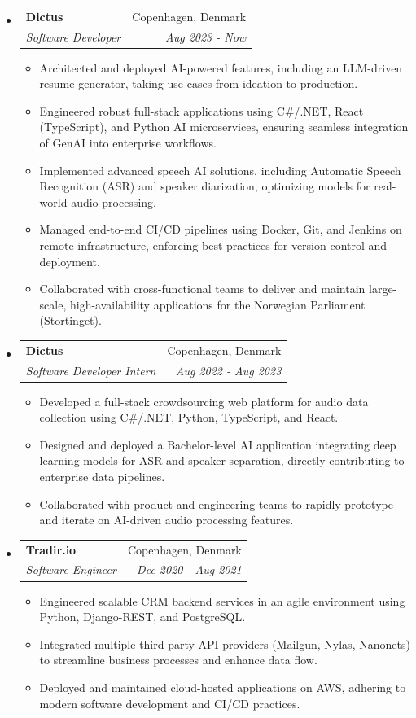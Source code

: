 \documentclass[letterpaper,11pt]{article}
\makeatletter
\newcommand{\resitem}[1]{\item #1 \vspace{-2pt}}
\newcommand{\ressubheading}[4]{
    \begin{tabular*}{6.5in}{p{4.8in}@{\extracolsep{\fill}}r}
            \textbf{#1} & #2 \\
            \textit{#3} & \textit{#4} \\
    \end{tabular*}\vspace{-8pt}}
\makeatother
\begin{document}
      \begin{itemize}
        \item \ressubheading{Dictus}{Copenhagen, Denmark}{Software Developer}{Aug 2023 - Now}
        \begin{itemize}
            \resitem{Architected and deployed AI-powered features, including an LLM-driven resume generator, taking use-cases from ideation to production.}
            \resitem{Engineered robust full-stack applications using C\#/.NET, React (TypeScript), and Python AI microservices, ensuring seamless integration of GenAI into enterprise workflows.}
            \resitem{Implemented advanced speech AI solutions, including Automatic Speech Recognition (ASR) and speaker diarization, optimizing models for real-world audio processing.}
            \resitem{Managed end-to-end CI/CD pipelines using Docker, Git, and Jenkins on remote infrastructure, enforcing best practices for version control and deployment.}
            \resitem{Collaborated with cross-functional teams to deliver and maintain large-scale, high-availability applications for the Norwegian Parliament (Stortinget).}
        \end{itemize}
        \item \ressubheading{Dictus}{Copenhagen, Denmark}{Software Developer Intern}{Aug 2022 - Aug 2023}
        \begin{itemize}
            \resitem{Developed a full-stack crowdsourcing web platform for audio data collection using C\#/.NET, Python, TypeScript, and React.}
            \resitem{Designed and deployed a Bachelor-level AI application integrating deep learning models for ASR and speaker separation, directly contributing to enterprise data pipelines.}
            \resitem{Collaborated with product and engineering teams to rapidly prototype and iterate on AI-driven audio processing features.}
        \end{itemize}
        \item \ressubheading{Tradir.io}{Copenhagen, Denmark}{Software Engineer}{Dec 2020 - Aug 2021}
        \begin{itemize}
            \resitem{Engineered scalable CRM backend services in an agile environment using Python, Django-REST, and PostgreSQL.}
            \resitem{Integrated multiple third-party API providers (Mailgun, Nylas, Nanonets) to streamline business processes and enhance data flow.}
            \resitem{Deployed and maintained cloud-hosted applications on AWS, adhering to modern software development and CI/CD practices.}
        \end{itemize}

\end{itemize}
\end{document}
